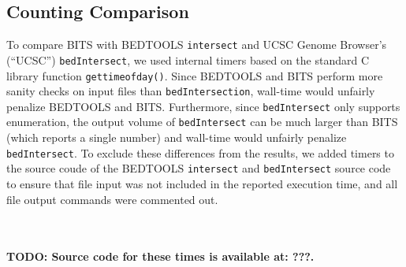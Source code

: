 \subsection{Counting Comparison}
To compare BITS with BEDTOOLS {\tt intersect} and UCSC Genome Browser’s
(``UCSC'') {\tt bedIntersect}, we used internal timers based on the standard C
library function {\tt gettimeofday()}.  Since BEDTOOLS and BITS perform more
sanity checks on input files than {\tt bedIntersection}, wall-time would
unfairly penalize BEDTOOLS and BITS.  Furthermore, since {\tt bedIntersect} only
supports enumeration, the output volume of {\tt bedIntersect} can be much larger
than BITS (which reports a single number) and wall-time would unfairly penalize
{\tt bedIntersect}.  To exclude these differences from the results, we added
timers to the source coude of the BEDTOOLS {\tt intersect} and 
{\tt bedIntersect} source code to ensure that file input was not included in the
reported execution time, and all file output commands were commented out.

\\
\\
\textbf{TODO: Source code for these times is available at: ???.}
\\